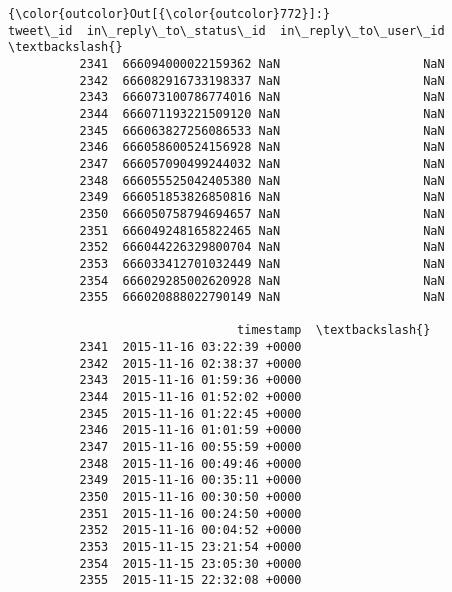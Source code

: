 \documentclass[11pt]{article}
\begin{document}
\begin{Verbatim}[commandchars=\\\{\}]
{\color{outcolor}Out[{\color{outcolor}772}]:}                 tweet\_id  in\_reply\_to\_status\_id  in\_reply\_to\_user\_id  \textbackslash{}
          2341  666094000022159362 NaN                    NaN                    
          2342  666082916733198337 NaN                    NaN                    
          2343  666073100786774016 NaN                    NaN                    
          2344  666071193221509120 NaN                    NaN                    
          2345  666063827256086533 NaN                    NaN                    
          2346  666058600524156928 NaN                    NaN                    
          2347  666057090499244032 NaN                    NaN                    
          2348  666055525042405380 NaN                    NaN                    
          2349  666051853826850816 NaN                    NaN                    
          2350  666050758794694657 NaN                    NaN                    
          2351  666049248165822465 NaN                    NaN                    
          2352  666044226329800704 NaN                    NaN                    
          2353  666033412701032449 NaN                    NaN                    
          2354  666029285002620928 NaN                    NaN                    
          2355  666020888022790149 NaN                    NaN                    
          
                                timestamp  \textbackslash{}
          2341  2015-11-16 03:22:39 +0000   
          2342  2015-11-16 02:38:37 +0000   
          2343  2015-11-16 01:59:36 +0000   
          2344  2015-11-16 01:52:02 +0000   
          2345  2015-11-16 01:22:45 +0000   
          2346  2015-11-16 01:01:59 +0000   
          2347  2015-11-16 00:55:59 +0000   
          2348  2015-11-16 00:49:46 +0000   
          2349  2015-11-16 00:35:11 +0000   
          2350  2015-11-16 00:30:50 +0000   
          2351  2015-11-16 00:24:50 +0000   
          2352  2015-11-16 00:04:52 +0000   
          2353  2015-11-15 23:21:54 +0000   
          2354  2015-11-15 23:05:30 +0000   
          2355  2015-11-15 22:32:08 +0000   
          

\end{Verbatim}
\end{document}
